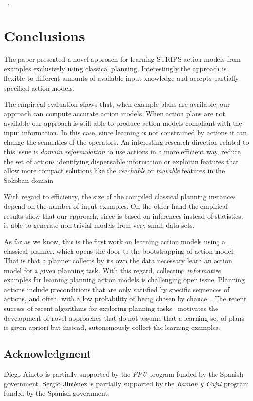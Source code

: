 \documentclass[letterpaper]{article} %
\begin{document}
~\cite{stern2017efficient}.


\section{Conclusions}
The paper presented a novel approach for learning STRIPS action models from examples exclusively using classical planning. Interestingly the approach is flexible to different amounts of available input knowledge and accepts partially specified action models.   

The empirical evaluation shows that, when example plans are available, our approach can compute accurate action models. When action plans are not available our approach is still able to produce action models compliant with the input information. In this case, since learning is not constrained by actions it can change the semantics of the operators. An interesting research direction related to this issue is {\em domain reformulation} to use actions in a more efficient way, reduce the set of actions identifying dispensable information or exploitin features that allow more compact solutions like the {\em reachable} or {\em movable} features in the Sokoban domain. 

With regard to efficiency, the size of the compiled classical planning instances depend on the number of input examples. On the other hand the empirical results show that our approach, since is based on inferences instead of statistics, is able to generate non-trivial models from very small data sets.

As far as we know, this is the first work on learning action models using a classical planner, which opens the door to the bootstrapping of action model. That is that a planner collects by its own the data necessary learn an action model for a given planning task. With this regard, collecting {\em informative} examples for learning planning action models is challenging open issue. Planning actions include preconditions that are only satisfied by specific sequences of actions, and often, with a low probability of being chosen by chance~\cite{fern2004learning}. The recent success of recent algorithms for exploring planning tasks~\cite{geffner:novelty:IJCAI17} motivates the development of novel approaches that do not assume that a learning set of plans is given apriori but instead, autonomously collect the learning examples.


\subsection*{Acknowledgment}
\begin{small}
Diego Aineto is partially supported by the {\it FPU} program funded by the Spanish government. Sergio Jim\'enez is partially supported by the {\it Ramon y Cajal} program funded by the Spanish government.
\end{small}

\newpage



\end{document}
